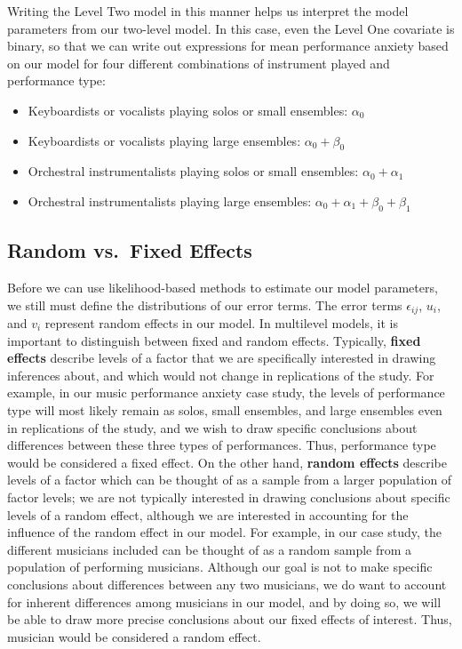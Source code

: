 \documentclass[
]{krantz}
\providecommand{\tightlist}{%
  \setlength{\itemsep}{0pt}\setlength{\parskip}{0pt}}
\begin{document}
Writing the Level Two model in this manner helps us interpret the model parameters from our two-level model. In this case, even the Level One covariate is binary, so that we can write out expressions for mean performance anxiety based on our model for four different combinations of instrument played and performance type:

\begin{itemize}
\tightlist
\item
  Keyboardists or vocalists playing solos or small ensembles: \(\alpha_{0}\)
\item
  Keyboardists or vocalists playing large ensembles: \(\alpha_{0}+\beta_{0}\)
\item
  Orchestral instrumentalists playing solos or small ensembles: \(\alpha_{0}+\alpha_{1}\)
\item
  Orchestral instrumentalists playing large ensembles: \(\alpha_{0}+\alpha_{1}+\beta_{0}+\beta_{1}\)
\end{itemize}

\subsection{Random vs.~Fixed Effects}\label{random-vs.-fixed-effects}

Before we can use likelihood-based methods to estimate our model parameters, we still must define the distributions of our error terms. The error terms \(\epsilon_{ij}\), \(u_{i}\), and \(v_{i}\) represent random effects in our model. In multilevel models, it is important to distinguish between fixed and random effects. Typically, \textbf{fixed effects}  describe levels of a factor that we are specifically interested in drawing inferences about, and which would not change in replications of the study. For example, in our music performance anxiety case study, the levels of performance type will most likely remain as solos, small ensembles, and large ensembles even in replications of the study, and we wish to draw specific conclusions about differences between these three types of performances. Thus, performance type would be considered a fixed effect. On the other hand, \textbf{random effects}  describe levels of a factor which can be thought of as a sample from a larger population of factor levels; we are not typically interested in drawing conclusions about specific levels of a random effect, although we are interested in accounting for the influence of the random effect in our model. For example, in our case study, the different musicians included can be thought of as a random sample from a population of performing musicians. Although our goal is not to make specific conclusions about differences between any two musicians, we do want to account for inherent differences among musicians in our model, and by doing so, we will be able to draw more precise conclusions about our fixed effects of interest. Thus, musician would be considered a random effect.
\end{document}
